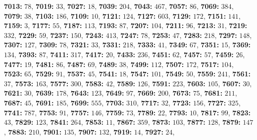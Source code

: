 \textsf{\bfseries 7013:} $78$, \textsf{\bfseries 7019:} $33$, \textsf{\bfseries 7027:} $18$, \textsf{\bfseries 7039:} $204$, \textsf{\bfseries 7043:} $467$, \textsf{\bfseries 7057:} $86$, \textsf{\bfseries 7069:} $384$, \textsf{\bfseries 7079:} $38$, \textsf{\bfseries 7103:} $186$, \textsf{\bfseries 7109:} $10$, \textsf{\bfseries 7121:} $124$, \textsf{\bfseries 7127:} $603$, \textsf{\bfseries 7129:} $172$, \textsf{\bfseries 7151:} $141$, \textsf{\bfseries 7159:} $3$, \textsf{\bfseries 7177:} $55$, \textsf{\bfseries 7187:} $113$, \textsf{\bfseries 7193:} $87$, \textsf{\bfseries 7207:} $104$, \textsf{\bfseries 7211:} $96$, \textsf{\bfseries 7213:} $31$, \textsf{\bfseries 7219:} $332$, \textsf{\bfseries 7229:} $59$, \textsf{\bfseries 7237:} $150$, \textsf{\bfseries 7243:} $413$, \textsf{\bfseries 7247:} $78$, \textsf{\bfseries 7253:} $47$, \textsf{\bfseries 7283:} $218$, \textsf{\bfseries 7297:} $148$, \textsf{\bfseries 7307:} $127$, \textsf{\bfseries 7309:} $78$, \textsf{\bfseries 7321:} $33$, \textsf{\bfseries 7331:} $218$, \textsf{\bfseries 7333:} $41$, \textsf{\bfseries 7349:} $67$, \textsf{\bfseries 7351:} $15$, \textsf{\bfseries 7369:} $134$, \textsf{\bfseries 7393:} $87$, \textsf{\bfseries 7411:} $317$, \textsf{\bfseries 7417:} $20$, \textsf{\bfseries 7433:} $236$, \textsf{\bfseries 7451:} $62$, \textsf{\bfseries 7457:} $57$, \textsf{\bfseries 7459:} $26$, \textsf{\bfseries 7477:} $19$, \textsf{\bfseries 7481:} $86$, \textsf{\bfseries 7487:} $69$, \textsf{\bfseries 7489:} $38$, \textsf{\bfseries 7499:} $112$, \textsf{\bfseries 7507:} $172$, \textsf{\bfseries 7517:} $104$, \textsf{\bfseries 7523:} $65$, \textsf{\bfseries 7529:} $91$, \textsf{\bfseries 7537:} $45$, \textsf{\bfseries 7541:} $18$, \textsf{\bfseries 7547:} $101$, \textsf{\bfseries 7549:} $50$, \textsf{\bfseries 7559:} $241$, \textsf{\bfseries 7561:} $37$, \textsf{\bfseries 7573:} $163$, \textsf{\bfseries 7577:} $300$, \textsf{\bfseries 7583:} $42$, \textsf{\bfseries 7589:} $126$, \textsf{\bfseries 7591:} $223$, \textsf{\bfseries 7603:} $105$, \textsf{\bfseries 7607:} $30$, \textsf{\bfseries 7621:} $30$, \textsf{\bfseries 7639:} $178$, \textsf{\bfseries 7643:} $123$, \textsf{\bfseries 7649:} $97$, \textsf{\bfseries 7669:} $200$, \textsf{\bfseries 7673:} $75$, \textsf{\bfseries 7681:} $211$, \textsf{\bfseries 7687:} $45$, \textsf{\bfseries 7691:} $185$, \textsf{\bfseries 7699:} $555$, \textsf{\bfseries 7703:} $310$, \textsf{\bfseries 7717:} $32$, \textsf{\bfseries 7723:} $156$, \textsf{\bfseries 7727:} $325$, \textsf{\bfseries 7741:} $787$, \textsf{\bfseries 7753:} $91$, \textsf{\bfseries 7757:} $146$, \textsf{\bfseries 7759:} $73$, \textsf{\bfseries 7789:} $22$, \textsf{\bfseries 7793:} $10$, \textsf{\bfseries 7817:} $99$, \textsf{\bfseries 7823:} $43$, \textsf{\bfseries 7829:} $123$, \textsf{\bfseries 7841:} $264$, \textsf{\bfseries 7853:} $11$, \textsf{\bfseries 7867:} $359$, \textsf{\bfseries 7873:} $103$, \textsf{\bfseries 7877:} $128$, \textsf{\bfseries 7879:} $147$, \textsf{\bfseries 7883:} $210$, \textsf{\bfseries 7901:} $135$, \textsf{\bfseries 7907:} $132$, \textsf{\bfseries 7919:} $14$, \textsf{\bfseries 7927:} $24$, 
